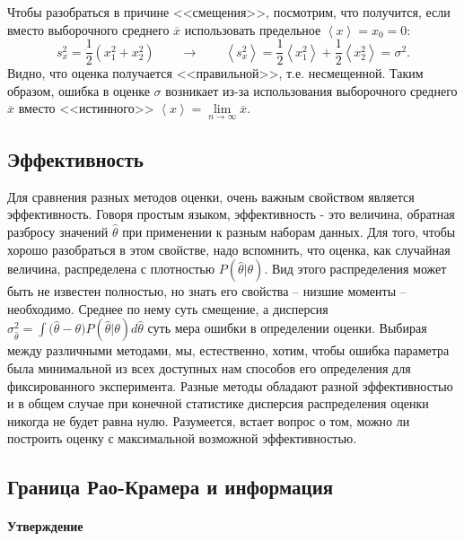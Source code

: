 {    Чтобы разобраться в причине <<смещения>>,
    посмотрим, что получится, если вместо выборочного среднего $\overline{x}$
    использовать предельное $\left\langle x\right\rangle =x_{0}=0$:
    \[
    s_{x}^{2}=\frac{1}{2}\left(x_{1}^{2}+x_{2}^{2}\right)\qquad\to\qquad\left\langle s_{x}^{2}\right\rangle =\frac{1}{2}\left\langle x_{1}^{2}\right\rangle +\frac{1}{2}\left\langle x_{2}^{2}\right\rangle =\sigma^{2}.
    \]
    Видно, что оценка получается <<правильной>>,
    т.е. несмещенной. Таким образом, ошибка в оценке $\sigma$ возникает
    из-за использования выборочного среднего $\overline{x}$ вместо <<истинного>>
    $\left\langle x\right\rangle =\lim\limits_{n\to\infty}\overline{x}$.
}

\subsection{Эффективность}

Для сравнения разных методов оценки, очень важным свойством является
эффективность. Говоря простым языком, эффективность - это величина,
обратная разбросу значений $\hat{\theta}$ при применении к разным
наборам данных. Для того, чтобы хорошо разобраться в этом свойстве, надо
вспомнить, что оценка, как случайная величина, распределена с плотностью
$P(\hat\theta | \theta)$. Вид этого распределения может быть не
известен полностью, но знать его свойства -- низшие моменты --
необходимо. Среднее по нему суть смещение, а дисперсия
$\sigma_{\hat\theta}^2 = \int{ (\hat\theta - \theta} ) P(\hat\theta | \theta) d\hat\theta$
суть мера ошибки в определении оценки. Выбирая между различными
методами, мы, естественно, хотим, чтобы ошибка параметра была
минимальной из всех доступных нам способов его определения для
фиксированного эксперимента. Разные методы обладают разной
эффективностью и в общем случае при конечной статистике дисперсия
распределения оценки никогда не будет равна нулю. Разумеется, встает
вопрос о том, можно ли построить оценку с максимальной возможной
эффективностью.

\subsection{Граница Рао-Крамера и информация}

\paragraph{Утверждение}

